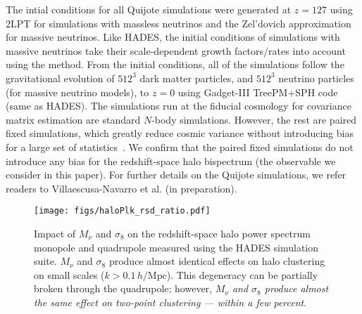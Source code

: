 \documentclass[12pt, letterpaper, preprint]{aastex62}
\newcommand{\smnu}{M_\nu}
\newcommand{\sig}{\sigma_8}
\newcommand{\hmpc}{\,h/\mathrm{Mpc}}
\begin{document}
The intial conditions for all Quijote simulations were generated at $z=127$ using 
2LPT for simulations with massless neutrinos and the Zel’dovich approximation for 
massive neutrinos. Like HADES, the initial conditions of simulations with massive
neutrinos take their scale-dependent growth factors/rates into account using the
\cite{zennaro2017a} method. From the initial conditions, all of the simulations 
follow the gravitational evolution of $512^3$ dark matter particles, and $512^3$ 
neutrino particles (for massive neutrino models), to $z=0$ using {\sc Gadget-III}
TreePM+SPH code (same as HADES). The simulations run at the fiducial cosmology for 
covariance matrix estimation are standard $N$-body simulations. However, the rest 
are paired fixed simulations, which greatly reduce cosmic variance without introducing 
bias for a large set of statistics~\citep{angulo2016,pontzen2016,villaescusa-navarro2018}. 
We confirm that the paired fixed simulations do not introduce any bias for the 
redshift-space halo bispectrum (the observable we consider in this paper). For 
further details on the Quijote simulations, we refer readers to 
Villaescusa-Navarro et al. (in preparation). 

\begin{figure}
\begin{center}
\texttt{[image: figs/haloPlk\_rsd\_ratio.pdf]}
    \caption{Impact of $\smnu$ and $\sig$ on the redshift-space halo power 
    spectrum monopole and quadrupole measured using the HADES simulation suite. 
    $\smnu$ and $\sig$ produce almost identical effects on halo clustering on 
    small scales ($k > 0.1\hmpc$). This degeneracy can be partially broken 
    through the quadrupole; however, {\em $\smnu$ and $\sig$ produce almost 
    the same effect on two-point clustering --- within a few percent}.
    }
\label{fig:plk}
\end{center}
\end{figure}
\end{document}
